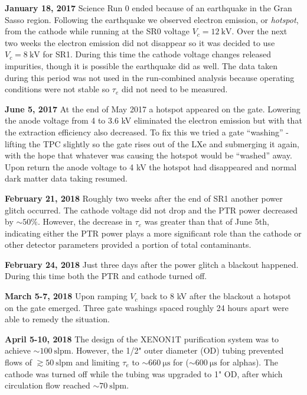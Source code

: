 \textbf{January 18, 2017} Science Run 0 ended because of an earthquake in the Gran Sasso region.  Following the earthquake we observed
electron emission, or \textit{hotspot}, from the cathode while running at the SR0 voltage $V_c = 12\ \mathrm{kV}$.  Over the next two
weeks the electron emission did
not disappear so it was decided to use $V_c = 8\ \mathrm{kV}$ for SR1.  During this time the cathode voltage changes released impurities,
though it is possible the earthquake did as well.  The data taken during this period was not used in the run-combined analysis because
operating conditions were not stable so $\tau_e$ did not need to be measured.

\textbf{June 5, 2017}  At the end of May 2017 a hotspot appeared on the gate.  Lowering the anode voltage from 4 to 3.6 kV eliminated the
electron emission but with that the extraction efficiency also decreased.  To fix this we tried a gate ``washing'' - lifting the TPC
slightly so the gate rises out of the LXe and submerging it again, with the hope that whatever was causing the hotspot would be ``washed''
away.  Upon return the anode voltage to 4 kV the hotspot had disappeared and normal dark matter data taking resumed.

\textbf{February 21, 2018}  Roughly two weeks after the end of SR1 another power glitch occurred.  The cathode voltage did not drop and
the PTR power decreased by ${\sim} 50\%$.  However, the decrease in $\tau_e$ was greater than that of June 5th, indicating either the PTR
power plays a more significant role than the cathode or other detector parameters provided a portion of total contaminants.

\textbf{February 24, 2018}  Just three days after the power glitch a blackout happened.  During this time both the PTR and cathode turned
off.

\textbf{March 5-7, 2018}  Upon ramping $V_c$ back to 8 kV after the blackout a hotspot on the gate emerged.  Three gate washings spaced
roughly 24 hours apart were able to remedy the situation.

\textbf{April 5-10, 2018}  The design of the XENON1T purification system was to achieve ${\sim} 100\ \mathrm{slpm}$.  However, the
1/2" outer diameter (OD) tubing prevented flows of $\gtrsim 50\ \mathrm{slpm}$ and limiting $\tau_e$ to ${\sim} 660\ \mathrm{\mu s}$ for
\metakr (${\sim} 600\ \mathrm{\mu s}$ for alphas).  The cathode was turned off while the tubing was upgraded to 1" OD, after which
circulation flow reached ${\sim} 70\ \mathrm{slpm}$.

